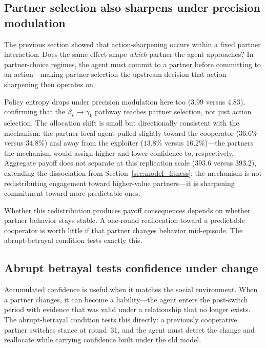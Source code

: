 \subsection{Partner selection also sharpens under precision modulation}
\label{sec:partner_choice}

The previous section showed that action-sharpening occurs within a fixed partner interaction. Does the same effect shape \emph{which} partner the agent approaches? In partner-choice regimes, the agent must commit to a partner before committing to an action---making partner selection the upstream decision that action sharpening then operates on.

Policy entropy drops under precision modulation here too ($3.99$ versus $4.83$), confirming that the $\beta_k \rightarrow \gamma_k$ pathway reaches partner selection, not just action selection. The allocation shift is small but directionally consistent with the mechanism: the partner-local agent pulled slightly toward the cooperator ($36.6\%$ versus $34.8\%$) and away from the exploiter ($13.8\%$ versus $16.2\%$)---the partners the mechanism would assign higher and lower confidence to, respectively. Aggregate payoff does not separate at this replication scale ($393.6$ versus $393.2$), extending the dissociation from Section~\ref{sec:model_fitness}: the mechanism is not redistributing engagement toward higher-value partners---it is sharpening commitment toward more predictable ones.

Whether this redistribution produces payoff consequences depends on whether partner behavior stays stable. A one-round reallocation toward a predictable cooperator is worth little if that partner changes behavior mid-episode. The abrupt-betrayal condition tests exactly this.

\subsection{Abrupt betrayal tests confidence under change}
\label{sec:betrayal}

Accumulated confidence is useful when it matches the social environment. When a partner changes, it can become a liability---the agent enters the post-switch period with evidence that was valid under a relationship that no longer exists. The abrupt-betrayal condition tests this directly: a previously cooperative partner switches stance at round~31, and the agent must detect the change and reallocate while carrying confidence built under the old model.

